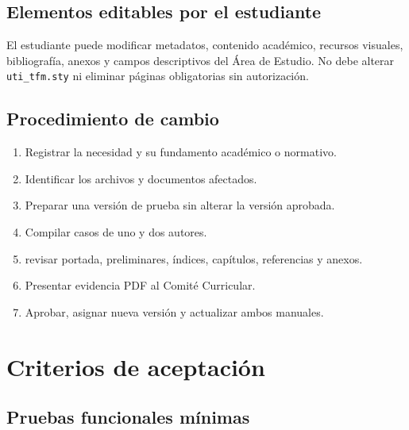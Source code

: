\documentclass[12pt,a4paper,oneside]{report}
\begin{document}
\section{Elementos editables por el estudiante}

El estudiante puede modificar metadatos, contenido académico, recursos visuales, bibliografía, anexos y campos descriptivos del Área de Estudio. No debe alterar \texttt{uti\_tfm.sty} ni eliminar páginas obligatorias sin autorización.

\section{Procedimiento de cambio}

\begin{enumerate}
  \item Registrar la necesidad y su fundamento académico o normativo.
  \item Identificar los archivos y documentos afectados.
  \item Preparar una versión de prueba sin alterar la versión aprobada.
  \item Compilar casos de uno y dos autores.
  \item revisar portada, preliminares, índices, capítulos, referencias y anexos.
  \item Presentar evidencia PDF al Comité Curricular.
  \item Aprobar, asignar nueva versión y actualizar ambos manuales.
\end{enumerate}

\chapter{Criterios de aceptación}

\section{Pruebas funcionales mínimas}
\end{document}
